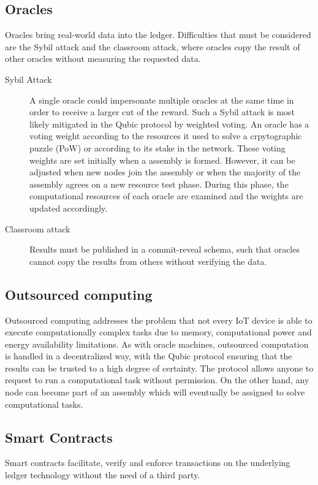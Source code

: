 \subsection{Oracles}\label{oracles}
Oracles bring real-world data into the ledger. Difficulties that must be considered are the Sybil attack and the classroom attack, where oracles copy the result of other oracles without measuring the requested data.
\begin{description}
    \item[Sybil Attack] A single oracle could impersonate multiple oracles at the same time in order to receive a larger cut of the reward. Such a Sybil attack is most likely mitigated in the Qubic protocol by weighted voting. An oracle has a voting weight according to the resources it used to solve a crpytographic puzzle (PoW) or according to its stake in the network. These voting weights are set initially when a assembly is formed. However, it can be adjusted when new nodes join the assembly or when the majority of the assembly agrees on a new resource test phase. During this phase, the computational resources of each oracle are examined and the weights are updated accordingly.
    \item[Classroom attack] Results must be published in a commit-reveal schema, such that oracles cannot copy the results from others without verifying the data. 
\end{description}

\subsection{Outsourced computing}
Outsourced computing addresses the problem that not every IoT device is able to execute computationally complex tasks due to memory, computational power and energy availability limitations. As with oracle machines, outsourced computation is handled in a decentralized way, with the Qubic protocol ensuring that the results can be trusted to a high degree of certainty. The protocol allows anyone to request to run a computational task without permission. On the other hand, any node can become part of an assembly which will eventually be assigned to solve computational tasks.

\subsection{Smart Contracts}
Smart contracts facilitate, verify and enforce transactions on the underlying ledger technology without the need of a third party.

